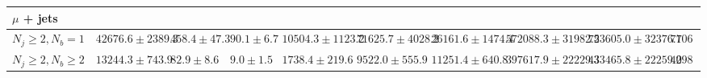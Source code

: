\begin{sidewaystable}
{\begin{tabular}{l|ccccccc|cc}
        \hline
        \multicolumn{10}{l}{$\mu$ + jets} \\
        \hline
        $N_{j} \geq 2, N_{b} = 1$          & $42676.6 \pm 2389.3$ & $458.4 \pm 47.3$   & $90.1 \pm 6.7$     & $10504.3 \pm 1123.2$   & $71625.7 \pm 4028.2$ & $26161.6 \pm 1474.4$ & $572088.3 \pm 31982.5$ & $723605.0 \pm 32376.7$ & $710650$ \\
        $N_{j} \geq 2, N_{b} \geq 2$       & $13244.3 \pm 743.9$  & $82.9 \pm 8.6$     & $9.0 \pm 1.5$      & $1738.4 \pm 219.6$     & $9522.0 \pm 555.9$   & $11251.4 \pm 640.8$  & $397617.9 \pm 22229.3$ & $433465.8 \pm 22259.0$ & $429861$ \\
        \hline
    \end{tabular}}

    \label{tab:yields}
\end{sidewaystable}

